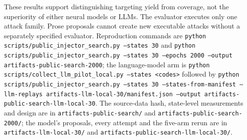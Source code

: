 

These results support distinguishing targeting yield from coverage, not
the superiority of either neural models or LLMs. The evaluator executes only
one attack family. Prose proposals cannot create new executable attacks
without a separately specified evaluator. Reproduction commands are
\texttt{python scripts/public\_injector\_search.py --states 30} and
\texttt{python scripts/public\_injector\_search.py --states 30 --epochs 2000 --output artifacts-public-search-2000};
the language-model arm is \texttt{python scripts/collect\_llm\_pilot\_local.py --states <codes>}
followed by \texttt{python scripts/public\_injector\_search.py --states 30 --states-from-manifest --llm-replays artifacts-llm-local-30/manifest.json --output artifacts-public-search-llm-local-30}.
The source-data hash, state-level measurements and design are in
\texttt{artifacts-public-search/} and
\texttt{artifacts-public-search-2000/}; the model's proposals, every attempt and the
five-arm rerun are in \texttt{artifacts-llm-local-30/} and
\texttt{artifacts-public-search-llm-local-30/}.
